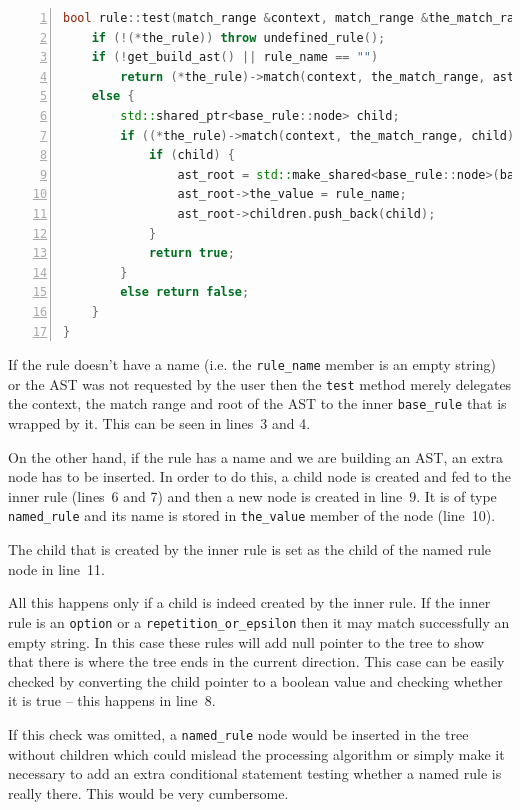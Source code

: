 \documentclass[12pt]{article}
\begin{document}
\begin{center}
	\begin{minipage}[ht]{0.9\textwidth}
		\begin{lstlisting}[language=C++, breaklines=true, numbers=left]
bool rule::test(match_range &context, match_range &the_match_range, std::shared_ptr<base_rule::node> &ast_root) {
	if (!(*the_rule)) throw undefined_rule();
	if (!get_build_ast() || rule_name == "")
		return (*the_rule)->match(context, the_match_range, ast_root);
	else {
		std::shared_ptr<base_rule::node> child;
		if ((*the_rule)->match(context, the_match_range, child)) {
			if (child) {
				ast_root = std::make_shared<base_rule::node>(base_rule::node::type::named_rule);
				ast_root->the_value = rule_name;
				ast_root->children.push_back(child);
			}
			return true;
		}
		else return false;
	}
}
		\end{lstlisting}
	\end{minipage}
\end{center}

If the rule doesn't have a name (i.e. the \texttt{rule\_name} member is an empty string) or the AST was not
requested by the user then the \texttt{test} method merely delegates the context, the match range and root of
the AST to the inner \texttt{base\_rule} that is wrapped by it. This can be seen in lines~3 and 4. 

On the other hand, if the rule has a name and we are building an AST, an extra node has to be inserted. In
order to do this, a child node is created and fed to the inner rule (lines~6 and 7) and then a new node is
created in line~9. It is of type \texttt{named\_rule} and its name is stored in \texttt{the\_value} member of
the node (line~10).

The child that is created by the inner rule is set as the child of the named rule node in line~11.

All this happens only if a child is indeed created by the inner rule. If the inner rule is an \texttt{option}
or a \texttt{repetition\_or\_epsilon} then it may match successfully an empty string. In this case these rules
will add null pointer to the tree to show that there is where the tree ends in the current direction. This
case can be easily checked by converting the child pointer to a boolean value and checking whether it is true
-- this happens in line~8.

If this check was omitted, a \texttt{named\_rule} node would be inserted in the tree without children which
could mislead the processing algorithm or simply make it necessary to add an extra conditional statement
testing whether a named rule is really there. This would be very cumbersome.
\end{document}
